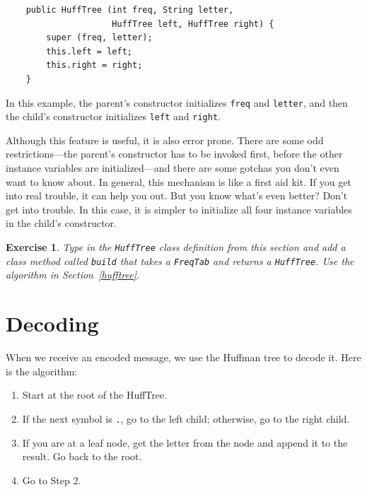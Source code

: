 \documentclass[12pt]{book}
\theoremstyle{exercise}
\newtheorem{exercise}{Exercise}[chapter]
\begin{document}
\begin{verbatim}
    public HuffTree (int freq, String letter, 
                     HuffTree left, HuffTree right) {
        super (freq, letter);
        this.left = left;
        this.right = right;
    }
\end{verbatim}

In this example, the parent's constructor initializes {\tt freq}
and {\tt letter}, and then the child's constructor initializes
{\tt left} and {\tt right}.

Although this feature is useful, it is also error prone.  There
are some odd restrictions---the parent's constructor has to be
invoked first, before the other instance variables are
initialized---and there are some gotchas you don't even want to
know about.  In general, this mechanism is like a first aid kit.
If you get into real trouble, it can help you out.  But you
know what's even better?  Don't get into trouble.  In this case,
it is simpler to initialize all four instance variables in
the child's constructor.

\begin{exercise}
Type in the {\tt HuffTree} class definition from this section
and add a class method called {\tt build} that takes a {\tt FreqTab}
and returns a {\tt HuffTree}.  Use the algorithm in Section~\ref{hufftree}.
\end{exercise}


\section{Decoding}

When we receive an encoded message, we use the Huffman tree to
decode it.  Here is the algorithm:

\begin{enumerate}

\item Start at the root of the HuffTree.

\item If the next symbol is {\tt .}, go to the left child; otherwise,
go to the right child.

\item If you are at a leaf node, get the letter from the node and
append it to the result.  Go back to the root.

\item Go to Step 2.

\end{enumerate}
\end{document}
